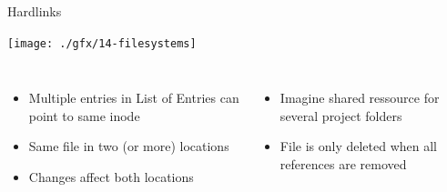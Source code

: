 
\begin{frame}{Hardlinks}
%
\vspace{-3pt}
\begin{center}
\texttt{[image: ./gfx/14-filesystems]}
\end{center}
%
\vspace{-6pt}
\begin{columns}
	\begin{itemize}
	\item Multiple entries in List of Entries can point to same inode
	\item[\Thus] Same file in two (or more) locations
	\item Changes affect both locations
	\end{itemize}
%
	\begin{itemize}
	\item Imagine shared ressource for several project folders
	\item File is only deleted when all references are removed
	\end{itemize}
\end{columns}
%
\end{frame}


